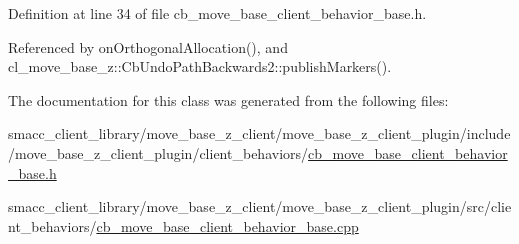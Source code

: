 Definition at line 34 of file cb\+\_\+move\+\_\+base\+\_\+client\+\_\+behavior\+\_\+base.\+h.



Referenced by on\+Orthogonal\+Allocation(), and cl\+\_\+move\+\_\+base\+\_\+z\+::\+Cb\+Undo\+Path\+Backwards2\+::publish\+Markers().



The documentation for this class was generated from the following files\+:\begin{DoxyCompactItemize}
\item 
smacc\+\_\+client\+\_\+library/move\+\_\+base\+\_\+z\+\_\+client/move\+\_\+base\+\_\+z\+\_\+client\+\_\+plugin/include/move\+\_\+base\+\_\+z\+\_\+client\+\_\+plugin/client\+\_\+behaviors/\hyperlink{cb__move__base__client__behavior__base_8h}{cb\+\_\+move\+\_\+base\+\_\+client\+\_\+behavior\+\_\+base.\+h}\item 
smacc\+\_\+client\+\_\+library/move\+\_\+base\+\_\+z\+\_\+client/move\+\_\+base\+\_\+z\+\_\+client\+\_\+plugin/src/client\+\_\+behaviors/\hyperlink{cb__move__base__client__behavior__base_8cpp}{cb\+\_\+move\+\_\+base\+\_\+client\+\_\+behavior\+\_\+base.\+cpp}\end{DoxyCompactItemize}
